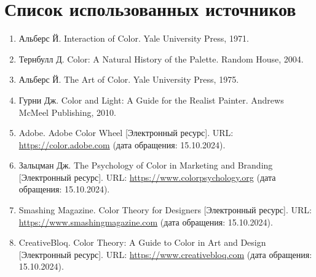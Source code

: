 \documentclass[bachelor, och, referat]{SCWorks}
\begin{document}
\newpage
\section*{Список использованных источников}
\begin{enumerate}
    \item Альберс Й. Interaction of Color. Yale University Press, 1971.
    \item Тернбулл Д. Color: A Natural History of the Palette. Random House, 2004.
    \item Альберс Й. The Art of Color. Yale University Press, 1975.
    \item Гурни Дж. Color and Light: A Guide for the Realist Painter. Andrews McMeel Publishing, 2010.
    \item Adobe. Adobe Color Wheel [Электронный ресурс]. URL: \url{https://color.adobe.com} (дата обращения: 15.10.2024).
    \item Зальцман Дж. The Psychology of Color in Marketing and Branding [Электронный ресурс]. URL: \url{https://www.colorpsychology.org} (дата обращения: 15.10.2024).
    \item Smashing Magazine. Color Theory for Designers [Электронный ресурс]. URL: \url{https://www.smashingmagazine.com} (дата обращения: 15.10.2024).
    \item CreativeBloq. Color Theory: A Guide to Color in Art and Design [Электронный ресурс]. URL: \url{https://www.creativebloq.com} (дата обращения: 15.10.2024).
\end{enumerate}
\end{document}
